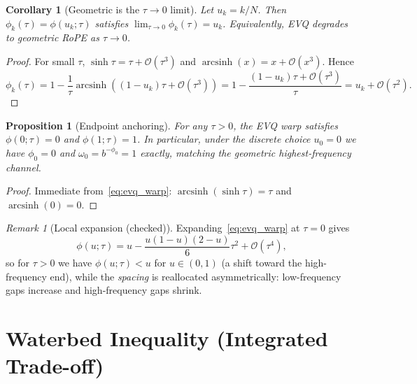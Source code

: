 \documentclass[11pt]{article}
\theoremstyle{plain}
\newtheorem{proposition}[theorem]{Proposition}
\newtheorem{corollary}[theorem]{Corollary}
\theoremstyle{definition}
\theoremstyle{remark}
\newtheorem{remark}[theorem]{Remark}
\newcommand{\asinh}{\operatorname{arcsinh}}
\begin{document}
\begin{corollary}[Geometric is the $\tau\to 0$ limit]
Let $u_k=k/N$. Then $\phi_k(\tau)=\phi(u_k;\tau)$ satisfies
$\lim_{\tau\to 0}\phi_k(\tau)=u_k$. Equivalently, EVQ degrades to geometric RoPE
as $\tau\to 0$.
\end{corollary}
\begin{proof}
For small $\tau$, $\sinh\tau=\tau+\mathcal{O}(\tau^3)$ and
$\asinh(x)=x+\mathcal{O}(x^3)$. Hence
\[
\phi_k(\tau)=1-\frac{1}{\tau}\asinh((1-u_k)\tau+\mathcal{O}(\tau^3))
=1-\frac{(1-u_k)\tau+\mathcal{O}(\tau^3)}{\tau}
=u_k+\mathcal{O}(\tau^2).
\]
\end{proof}

\begin{proposition}[Endpoint anchoring]
For any $\tau>0$, the EVQ warp satisfies $\phi(0;\tau)=0$ and $\phi(1;\tau)=1$.
In particular, under the discrete choice $u_0=0$ we have $\phi_0=0$ and
$\omega_0=b^{-\phi_0}=1$ exactly, matching the geometric highest-frequency
channel.
\end{proposition}
\begin{proof}
Immediate from~\eqref{eq:evq_warp}: $\asinh(\sinh\tau)=\tau$ and $\asinh(0)=0$.
\end{proof}

\begin{remark}[Local expansion (checked)]
Expanding~\eqref{eq:evq_warp} at $\tau=0$ gives
\begin{equation}
\phi(u;\tau)=u-\frac{u(1-u)(2-u)}{6}\tau^2+\mathcal{O}(\tau^4),
\label{eq:phi_taylor}
\end{equation}
so for $\tau>0$ we have $\phi(u;\tau)<u$ for $u\in(0,1)$ (a shift toward the
high-frequency end), while the \emph{spacing} is reallocated asymmetrically:
low-frequency gaps increase and high-frequency gaps shrink.
\end{remark}

\section{Waterbed Inequality (Integrated Trade-off)}
\end{document}
